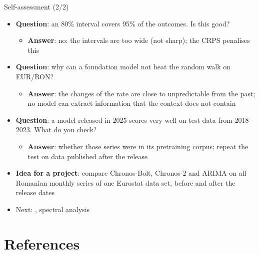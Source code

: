 \begin{frame}{Self-assessment (2/2)}
\itemsize{\small}
\begin{itemize}
    \item \textbf{Question}: an 80\% interval covers 95\% of the outcomes. Is this good?
    \begin{itemize}
        \item \textbf{Answer}: no: the intervals are too wide (not sharp); the CRPS penalises this
    \end{itemize}
    \item \textbf{Question}: why can a foundation model not beat the random walk on EUR/RON?
    \begin{itemize}
        \item \textbf{Answer}: the changes of the rate are close to unpredictable from the past; no model can extract information that the context does not contain
    \end{itemize}
    \item \textbf{Question}: a model released in 2025 scores very well on test data from 2018--2023. What do you check?
    \begin{itemize}
        \item \textbf{Answer}: whether those series were in its pretraining corpus; repeat the test on data published after the release
    \end{itemize}
    \item \textbf{Idea for a project}: compare Chronos-Bolt, Chronos-2 and ARIMA on all Romanian monthly series of one Eurostat data set, before and after the release dates
    \item Next: , spectral analysis
\end{itemize}
\end{frame}


\section{References}

